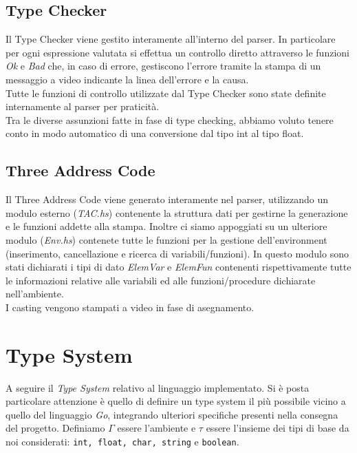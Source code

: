 \documentclass[12pt]{article}
\begin{document}
\subsection{Type Checker}
Il Type Checker viene gestito interamente all'interno del parser. In particolare per ogni espressione valutata si effettua un controllo diretto attraverso le funzioni \textit{Ok} e \textit{Bad} che, in caso di errore, gestiscono l'errore tramite la stampa di un messaggio a video indicante la linea dell'errore e la causa.\\
Tutte le funzioni di controllo utilizzate dal Type Checker sono state definite internamente al parser per praticità.\\
Tra le diverse assunzioni fatte in fase di type checking, abbiamo voluto tenere conto in modo automatico di una conversione dal tipo int al tipo float.

\subsection{Three Address Code}
Il Three Address Code viene generato interamente nel parser, utilizzando un modulo esterno (\textit{TAC.hs}) contenente la struttura dati per gestirne la generazione e le funzioni addette alla stampa. Inoltre ci siamo appoggiati su un ulteriore modulo (\textit{Env.hs}) contenete tutte le funzioni per la gestione dell'environment (inserimento, cancellazione e ricerca di variabili/funzioni).
In questo modulo sono stati dichiarati i tipi di dato \textit{ElemVar} e \textit{ElemFun} contenenti rispettivamente tutte le informazioni relative alle variabili ed alle funzioni/procedure dichiarate nell'ambiente.\\
I casting vengono stampati a video in fase di asegnamento.

\section{Type System}
A seguire il \textit{Type System} relativo al linguaggio implementato. Si è posta particolare attenzione è quello di definire un type system il più possibile vicino a quello del linguaggio \textit{Go}, integrando ulteriori specifiche presenti nella consegna del progetto.
Definiamo $\Gamma$ essere l'ambiente e $\tau$ essere l'insieme dei tipi di base da noi considerati: \texttt{int, float, char, string} e \texttt{boolean}.
\end{document}
